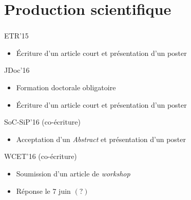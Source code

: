\documentclass{beamer}
\begin{document}
  \section{Production scientifique}
  \begin{frame}
    \frametitle{\secname}
    \small
    
    \begin{block}{ETR'15}
      \begin{itemize}
        \item Écriture d'un article court et présentation d'un poster
      \end{itemize}
    \end{block}

    \begin{block}{JDoc'16}
      \begin{itemize}
        \item Formation doctorale obligatoire
        \item Écriture d'un article court et présentation d'un poster
      \end{itemize}
    \end{block}
    
    \begin{block}{SoC-SiP'16 (co-écriture)}
      \begin{itemize}
        \item Acceptation d'un \emph{Abstract} et présentation d'un poster
      \end{itemize}
    \end{block}
    
    \begin{block}{WCET'16 (co-écriture)}
      \begin{itemize}
        \item Soumission d'un article de \emph{workshop}
        \item Réponse le 7 juin $(?)$
      \end{itemize}
    \end{block}
  \end{frame}
  
  
\end{document}
